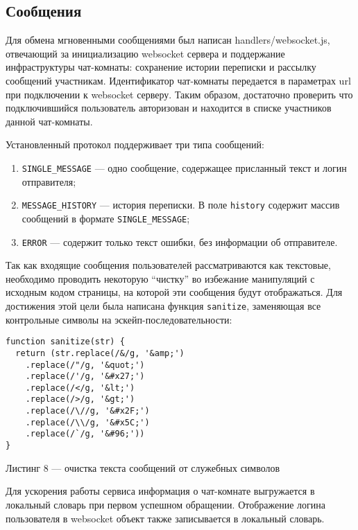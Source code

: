 \documentclass[14pt]{extarticle}
\begin{document}
\subsection{Сообщения}
Для обмена мгновенными сообщениями был написан handlers/websocket.js, отвечающий за инициализацию websocket сервера и поддержание инфраструктуры чат-комнаты: сохранение истории переписки и рассылку сообщений участникам. Идентификатор чат-комнаты передается в параметрах url при подключении к websocket серверу. Таким образом, достаточно проверить что подключившийся пользователь авторизован и находится в списке участников данной чат-комнаты.

Установленный протокол поддерживает три типа сообщений:
\begin{enumerate}
\item \texttt{SINGLE\_MESSAGE} --- одно сообщение, содержащее присланный текст и логин отправителя;
\item \texttt{MESSAGE\_HISTORY} --- история переписки. В поле \texttt{history} содержит массив сообщений в формате \texttt{SINGLE\_MESSAGE};
\item \texttt{ERROR} --- содержит только текст ошибки, без информации об отправителе.
\end{enumerate}

Так как входящие сообщения пользователей рассматриваются как текстовые, необходимо проводить некоторую \enquote{чистку} во избежание манипуляций с исходным кодом страницы, на которой эти сообщения будут отображаться. Для достижения этой цели была написана функция \texttt{sanitize}, заменяющая все контрольные символы на эскейп-последовательности:
\begin{lstlisting}
function sanitize(str) {
  return (str.replace(/&/g, '&amp;')
    .replace(/"/g, '&quot;')
    .replace(/'/g, '&#x27;')
    .replace(/</g, '&lt;')
    .replace(/>/g, '&gt;')
    .replace(/\//g, '&#x2F;')
    .replace(/\\/g, '&#x5C;')
    .replace(/`/g, '&#96;'))
}
\end{lstlisting}
\begin{center}
Листинг 8 --- очистка текста сообщений от служебных символов
\end{center}

Для ускорения работы сервиса информация о чат-комнате выгружается в локальный словарь при первом успешном обращении. Отображение логина пользователя в websocket объект также записывается в локальный словарь.
\end{document}
